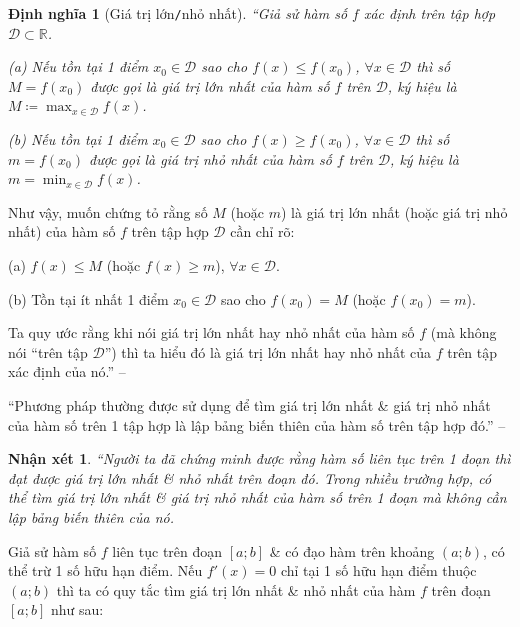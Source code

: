 \documentclass[oneside]{book}
\numberwithin{equation}{section}
\newtheorem{nhanxet}{Nhận xét}[section]
\newtheorem{dinhnghia}{Định nghĩa}[section]
\begin{document}
\begin{dinhnghia}[Giá trị lớn\texttt{/}nhỏ nhất]
	``Giả sử hàm số $f$ xác định trên tập hợp $\mathcal{D}\subset\mathbb{R}$.
	\begin{enumerate*}
		\item[(a)] Nếu tồn tại 1 điểm $x_0\in\mathcal{D}$ sao cho $f(x)\le f(x_0)$, $\forall x\in\mathcal{D}$ thì số $M = f(x_0)$ được gọi là \emph{giá trị lớn nhất} của hàm số $f$ trên $\mathcal{D}$, ký hiệu là $M\coloneqq\max_{x\in\mathcal{D}} f(x)$.
		\item[(b)] Nếu tồn tại 1 điểm $x_0\in\mathcal{D}$ sao cho $f(x)\ge f(x_0)$, $\forall x\in\mathcal{D}$ thì số $m = f(x_0)$ được gọi là \emph{giá trị nhỏ nhất} của hàm số $f$ trên $\mathcal{D}$, ký hiệu là $m = \min_{x\in\mathcal{D}} f(x)$.
	\end{enumerate*}
\end{dinhnghia}
Như vậy, muốn chứng tỏ rằng số $M$ (hoặc $m$) là giá trị lớn nhất (hoặc giá trị nhỏ nhất) của hàm số $f$ trên tập hợp $\mathcal{D}$ cần chỉ rõ:
\begin{enumerate*}
	\item[(a)] $f(x)\le M$ (hoặc $f(x)\ge m$), $\forall x\in\mathcal{D}$.
	\item[(b)] Tồn tại ít nhất 1 điểm $x_0\in\mathcal{D}$ sao cho $f(x_0) = M$ (hoặc $f(x_0) = m$).
\end{enumerate*}
Ta quy ước rằng khi nói giá trị lớn nhất hay nhỏ nhất của hàm số $f$ (mà không nói ``trên tập $\mathcal{D}$'') thì ta hiểu đó là giá trị lớn nhất hay nhỏ nhất của $f$ trên tập xác định của nó.'' -- \cite[p. 18]{SGK_Toan_12_giai_tich_nang_cao}

``Phương pháp thường được sử dụng để tìm giá trị lớn nhất \& giá trị nhỏ nhất của hàm số trên 1 tập hợp là lập bảng biến thiên của hàm số trên tập hợp đó.'' -- \cite[p. 19]{SGK_Toan_12_giai_tich_nang_cao}

\begin{nhanxet}
	``Người ta đã chứng minh được rằng hàm số liên tục trên 1 đoạn thì đạt được giá trị lớn nhất \& nhỏ nhất trên đoạn đó. Trong nhiều trường hợp, có thể tìm giá trị lớn nhất \& giá trị nhỏ nhất của hàm số trên 1 đoạn mà không cần lập bảng biến thiên của nó.
\end{nhanxet}
Giả sử hàm số $f$ liên tục trên đoạn $[a;b]$ \& có đạo hàm trên khoảng $(a;b)$, có thể trừ 1 số hữu hạn điểm. Nếu $f'(x) = 0$ chỉ tại 1 số hữu hạn điểm thuộc $(a;b)$ thì ta có quy tắc tìm giá trị lớn nhất \& nhỏ nhất của hàm $f$ trên đoạn $[a;b]$ như sau:
\end{document}

